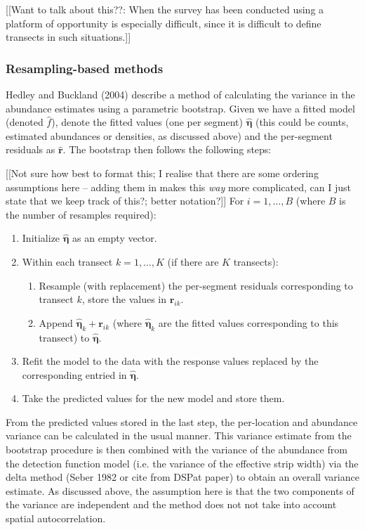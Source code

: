 \documentclass[useAMS,referee]{biom}
\begin{document}
[[Want to talk about this??: When the survey has been conducted using a platform of opportunity is especially difficult, since it is difficult to define transects in such situations.]]

\subsubsection{Resampling-based methods}

Hedley and Buckland (2004) describe a method of calculating the variance in the abundance estimates using a parametric bootstrap. Given we have a fitted model (denoted $\hat{f}$), denote the fitted values (one per segment) $\hat{\bm{\eta}}$ (this could be counts, estimated abundances or densities, as discussed above) and the per-segment residuals as $\hat{\mathbf{r}}$. The bootstrap then follows the following steps:

[[Not sure how best to format this; I realise that there are some ordering assumptions here -- adding them in makes this \textit{way} more complicated, can I just state that we keep track of this?; better notation?]]
For $i=1,\ldots,B$ (where $B$ is the number of resamples required):
\begin{enumerate}
	\item Initialize $\hat{\bm{\eta}}$ as an empty vector.
	\item Within each transect $k=1,\ldots,K$ (if there are $K$ transects):
	\begin{enumerate}
		\item Resample (with replacement) the per-segment residuals corresponding to transect $k$, store the values in $\mathbf{r}_{ik}$.
		\item Append $\hat{\bm{\eta}}_{k}+\mathbf{r}_{ik}$ (where $\hat{\bm{\eta}}_{k}$ are the fitted values corresponding to this transect) to $\hat{\bm{\eta}}$.
	\end{enumerate}
	\item Refit the model to the data with the response values replaced by the corresponding entried in $\hat{\bm{\eta}}$.
	\item Take the predicted values for the new model and store them.
\end{enumerate}
From the predicted values stored in the last step, the per-location and abundance variance can be calculated in the usual manner. This variance estimate from the bootstrap procedure is then combined with the variance of the abundance from the detection function model (i.e. the variance of the effective strip width) via the delta method (Seber 1982 or cite from DSPat paper) to obtain an overall variance estimate. As discussed above, the assumption here is that the two components of the variance are independent and the method does not not take into account spatial autocorrelation.
\end{document}
